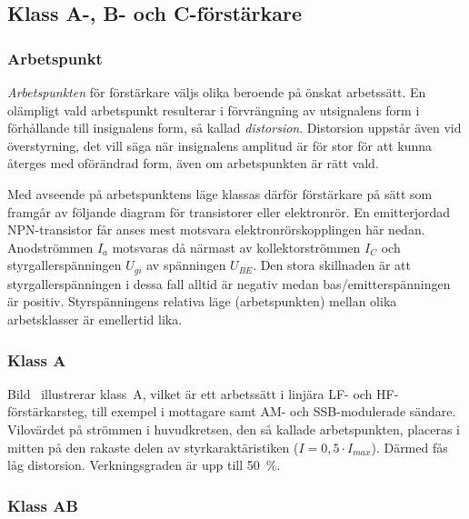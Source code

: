 \subsection{Klass A-, B- och C-förstärkare}
\label{klassabc}

\subsubsection{Arbetspunkt}

\emph{Arbetspunkten} för förstärkare väljs olika beroende på önskat arbetssätt.
En olämpligt vald arbetspunkt resulterar i förvrängning av utsignalens form i
förhållande till insignalens form, så kallad \emph{distorsion}.
Distorsion uppstår även vid överstyrning, det vill säga när insignalens
amplitud är för stor för att kunna återges med oförändrad form, även om
arbetspunkten är rätt vald.

Med avseende på arbetspunktens läge klassas därför förstärkare på sätt
som framgår av följande diagram för transistorer eller elektronrör.
En emitterjordad NPN-transistor får anses mest motsvara
elektronrörskopplingen här nedan.
Anodströmmen \(I_a\) motsvaras då närmast av kollektorströmmen
\(I_C\) och styrgallerspänningen \(U_{gi}\) av spänningen
\(U_{BE}\).
Den stora skillnaden är att styrgallerspänningen i dessa
fall alltid är negativ medan bas/emitterspänningen är positiv.
Styrspänningens relativa läge (arbetspunkten) mellan olika
arbetsklasser är emellertid lika.


\subsubsection{Klass A}

Bild~ illustrerar klass~A, vilket är ett arbetssätt i linjära
LF- och HF-förstärkarsteg, till exempel i mottagare samt AM- och SSB-modulerade
sändare.
Vilovärdet på strömmen i huvudkretsen, den så kallade arbetspunkten, placeras i
mitten på den rakaste delen av styrkaraktäristiken (\(I=0,5\cdot I_{max}\)).
Därmed fås låg distorsion.
Verkningsgraden är upp till \qty{50}{\percent}.

\subsubsection{Klass AB}

